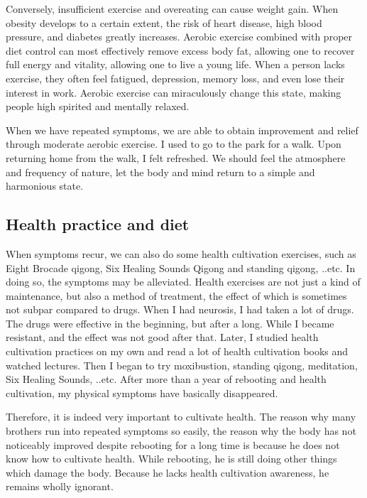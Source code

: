 \documentclass[
]{book}
\begin{document}
Conversely, insufficient exercise and overeating can cause weight gain. When obesity develops to a certain extent, the risk of heart disease, high blood pressure, and diabetes greatly increases. Aerobic exercise combined with proper diet control can most effectively remove excess body fat, allowing one to recover full energy and vitality, allowing one to live a young life. When a person lacks exercise, they often feel fatigued, depression, memory loss, and even lose their interest in work. Aerobic exercise can miraculously change this state, making people high spirited and mentally relaxed.

When we have repeated symptoms, we are able to obtain improvement and relief through moderate aerobic exercise. I used to go to the park for a walk. Upon returning home from the walk, I felt refreshed. We should feel the atmosphere and frequency of nature, let the body and mind return to a simple and harmonious state.

\hypertarget{health-practice-and-diet}{%
\subsection{Health practice and diet}\label{health-practice-and-diet}}

When symptoms recur, we can also do some health cultivation exercises, such as Eight Brocade qigong, Six Healing Sounds Qigong and standing qigong, ..etc. In doing so, the symptoms may be alleviated. Health exercises are not just a kind of maintenance, but also a method of treatment, the effect of which is sometimes not subpar compared to drugs. When I had neurosis, I had taken a lot of drugs. The drugs were effective in the beginning, but after a long. While I became resistant, and the effect was not good after that. Later, I studied health cultivation practices on my own and read a lot of health cultivation books and watched lectures. Then I began to try moxibustion, standing qigong, meditation, Six Healing Sounds, ..etc. After more than a year of rebooting and health cultivation, my physical symptoms have basically disappeared.

Therefore, it is indeed very important to cultivate health. The reason why many brothers run into repeated symptoms so easily, the reason why the body has not noticeably improved despite rebooting for a long time is because he does not know how to cultivate health. While rebooting, he is still doing other things which damage the body. Because he lacks health cultivation awareness, he remains wholly ignorant.
\end{document}
